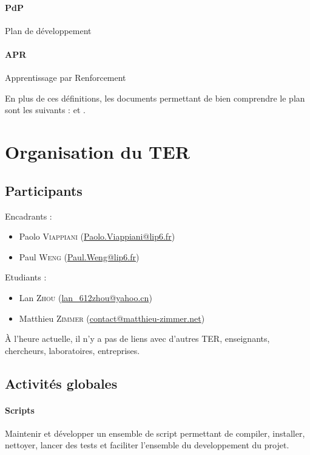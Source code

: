 \documentclass[a4paper,12pt]{article}
\begin{document}
   \paragraph{PdP} Plan de développement
   
   \paragraph{APR} Apprentissage par Renforcement
   
  \bigskip
  En plus de ces définitions, les documents permettant de bien 
    comprendre le plan sont les suivants : \cite{PDMIA} et \cite{ReinforceLearningIntro}.
  
  \newpage 
  \section{Organisation du TER}

    \subsection{Participants}
	Encadrants :
	\begin{itemize}
		\item Paolo \textsc{Viappiani} (\href{mailto:Paolo.Viappiani@lip6.fr}{Paolo.Viappiani@lip6.fr})
		\item Paul \textsc{Weng} (\href{mailto:Paul.Weng@lip6.fr }{Paul.Weng@lip6.fr})
	\end{itemize}

	\bigskip
	Etudiants :
	\begin{itemize}
		\item Lan \textsc{Zhou} (\href{mailto:lan\_612zhou@yahoo.cn}{lan\_612zhou@yahoo.cn})
		\item Matthieu \textsc{Zimmer} (\href{mailto:contact@matthieu-zimmer.net}{contact@matthieu-zimmer.net})
	\end{itemize}

	\bigskip
	À l'heure actuelle, il n'y a pas de liens avec d'autres TER, enseignants, chercheurs,
	laboratoires, entreprises.
    
    \subsection{Activités globales}
      \paragraph{Scripts} Maintenir et développer un ensemble de script permettant de compiler, installer, nettoyer, lancer
      des tests et faciliter l'ensemble du developpement du projet.
      
\end{document}
